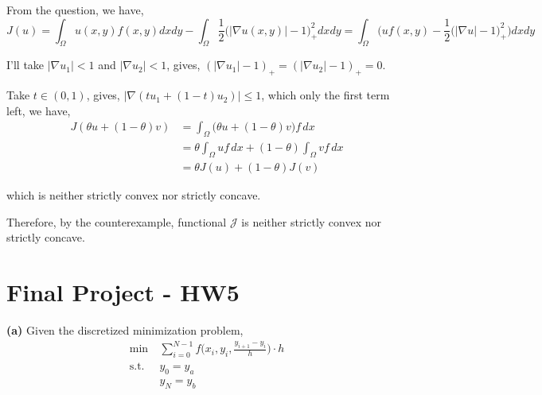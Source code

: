 \documentclass[12pt]{article}
\begin{document}
From the question, we have, 
$$
J(u)=\int_\Omega u(x,y)f(x,y) dx dy-\int_\Omega \frac{1}{2}\big(|\nabla u(x,y)|-1\big)_+^2 dx dy = \int_\Omega \Big(u f(x, y) - \frac{1}{2}\big(|\nabla u|-1\big)_+^2 \Big)dx dy
$$

I'll take $|\nabla u_1| < 1$ and $|\nabla u_2| < 1$, gives, $(|\nabla u_1|-1)_+=(|\nabla u_2|-1)_+=0$.

Take $t \in(0,1)$, gives, $|\nabla(t u_1 +(1-t)u_2)| \le 1$, which only the first term left, we have, 
\begin{align*}
J(\theta u+(1-\theta)v)
&=\int_\Omega \big(\theta u+(1-\theta)v\big)f\,dx \\
&=\theta\!\int_\Omega u f\,dx+(1-\theta)\!\int_\Omega v f\,dx \\
&=\theta J(u)+(1-\theta)J(v)
\end{align*}

which is neither strictly convex nor strictly concave.

Therefore, by the counterexample, functional $\mathcal J$ is neither strictly convex nor strictly concave.



\newpage

\section{Final Project - HW5}
\textbf{(a)} Given the discretized minimization problem, 
\begin{align*}
	\min\ & \sum_{i=0}^{N-1} f\Big(x_i,y_i,\frac{y_{i+1}-y_i}{h}\Big)\cdot h\\
	\text{s.t. }&y_0=y_a\\
	&y_N=y_b
\end{align*}
\end{document}
